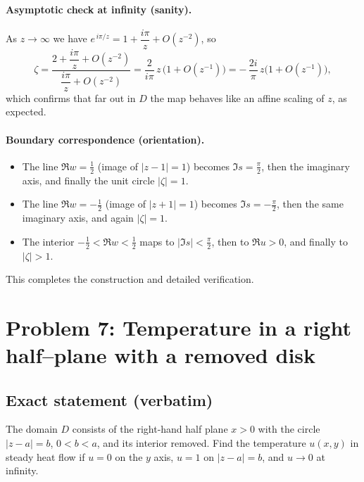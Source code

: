 \documentclass[11pt]{article}
\begin{document}
	\paragraph{Asymptotic check at infinity (sanity).}
	As $z\to\infty$ we have $e^{\,i\pi/z}=1+\dfrac{i\pi}{z}+O(z^{-2})$, so
	\[
	\zeta
	=\frac{2+\dfrac{i\pi}{z}+O(z^{-2})}{\dfrac{i\pi}{z}+O(z^{-2})}
	= \frac{2}{i\pi}\,z\,\Big(1+O(z^{-1})\Big)
	= -\,\frac{2i}{\pi}\,z\Big(1+O(z^{-1})\Big),
	\]
	which confirms that far out in $D$ the map behaves like an affine scaling of $z$, as expected.
	
	\paragraph{Boundary correspondence (orientation).}
	\begin{itemize}
		\item The line $\Re w=\tfrac12$ (image of $|z-1|=1$) becomes $\Im s=\tfrac{\pi}{2}$,
		then the imaginary axis, and finally the unit circle $|\zeta|=1$.
		\item The line $\Re w=-\tfrac12$ (image of $|z+1|=1$) becomes $\Im s=-\tfrac{\pi}{2}$,
		then the same imaginary axis, and again $|\zeta|=1$.
		\item The interior $-\tfrac12<\Re w<\tfrac12$ maps to $|\Im s|<\tfrac{\pi}{2}$,
		then to $\Re u>0$, and finally to $|\zeta|>1$.
	\end{itemize}
	This completes the construction and detailed verification.
	
	
	\section{Problem 7: Temperature in a right half–plane with a removed disk}
	
	\subsection*{Exact statement (verbatim)}
	The domain $D$ consists of the right-hand half plane $x>0$ with the circle $|z-a|=b$, $0<b<a$, and its interior removed.
	Find the temperature $u(x,y)$ in steady heat flow if $u=0$ on the $y$ axis, $u=1$ on $|z-a|=b$, and $u\to0$ at infinity.
	
\end{document}
